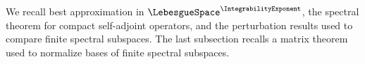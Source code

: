 We recall best approximation in
$\LebesgueSpace^\IntegrabilityExponent$,
the spectral theorem for compact self-adjoint operators,
and the perturbation results used to compare finite spectral subspaces.
The last subsection recalls a matrix theorem used to normalize bases of
finite spectral subspaces.
